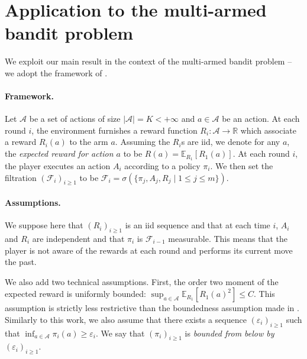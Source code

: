 \section{Application to the multi-armed bandit problem}
\label{sec: bandit}

We exploit our main result in the context of the multi-armed bandit problem -- we adopt the framework of \citet{seldin2012bandit}.

\paragraph{Framework.} Let $\mathcal{A}$ be a set of actions of size $|\mathcal{A}|=K<+\infty$ and $a\in\mathcal{A}$ be an action. At each round $i$, the environment furnishes a reward function $R_i:\mathcal{A}\rightarrow \mathbb{R}$ which associate a reward $R_i(a)$ to the arm $a$. Assuming the $R_i$s are iid, we denote for any $a$, the \emph{expected reward for action $a$} to be $R(a)= \mathbb{E}_{R_1}[R_1(a)]$.
At each round $i$, the player executes an action $A_i$ according to a policy $\pi_i$. We then set the filtration $(\mathcal{F}_i)_{i\geq 1}$ to be $\mathcal{F}_i = \sigma\left( \{\pi_j,A_j,R_j \mid 1\leq j\leq m\}    \right)$.


\paragraph{Assumptions.} We suppose here that $(R_i)_{i\geq 1}$ is an iid sequence and that at each time $i$, $A_i$ and $R_i$ are independent and that $\pi_i$ is $\mathcal{F}_{i-1}$ measurable. This means that the player is not aware of the rewards at each round and performs its current move \wrt the past.

We also add two technical assumptions. First, the order two moment of the expected reward is uniformly bounded: $\sup_{a\in\mathcal{A}} \mathbb{E}_{R_1}[R_1(a)^2] \leq C$. This assumption is strictly less restrictive than the boundedness assumption made in \cite{seldin2012bandit}. Similarly to this work, we also assume that there exists a sequence $(\varepsilon_i)_{i\geq 1}$ such that $\inf_{a\in\mathcal{A}} \pi_i(a) \geq \varepsilon_i$.
We say that $(\pi_i)_{i\geq 1}$ is \emph{bounded from below by} $(\varepsilon_i)_{i\geq 1}$.


